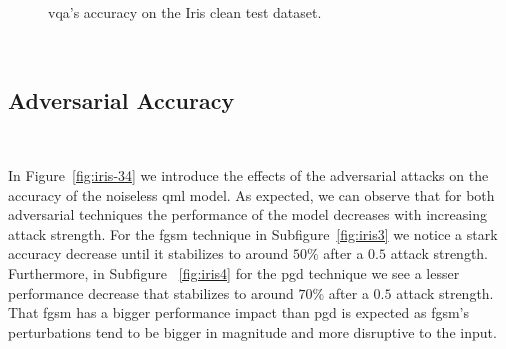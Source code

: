 \begin{figure}[!h]
  \caption{\ac{vqa}'s accuracy on the Iris clean test dataset.}
  \label{fig:iris-12}
\end{figure} \

\subsection{Adversarial Accuracy}\label{subsection:iris-adv-acc} \

In Figure~\ref{fig:iris-34} we introduce the effects of the
adversarial attacks on the accuracy of the noiseless \ac{qml}
model. As expected, we can observe that for both adversarial
techniques the performance of the model decreases with increasing
attack strength. For the \ac{fgsm} technique in Subfigure~\ref{fig:iris3}
we notice a stark accuracy decrease until it stabilizes to around
\(50\%\) after a \(0.5\) attack strength. Furthermore, in Subfigure
~\ref{fig:iris4} for the \ac{pgd} technique we see a lesser performance
decrease that stabilizes to around \(70\%\) after a \(0.5\) attack strength. 
That \ac{fgsm} has a bigger performance impact than \ac{pgd} is expected
as \ac{fgsm}'s perturbations tend to be bigger in magnitude and more
disruptive to the input. \

